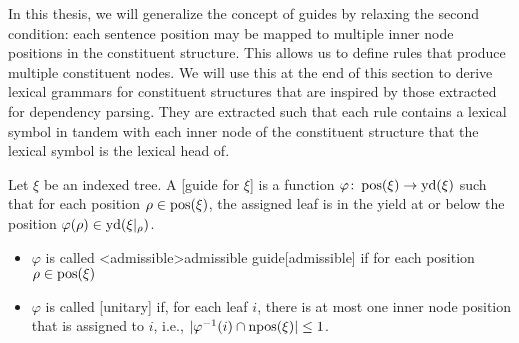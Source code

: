\documentclass[../../document.tex]{subfiles}
\begin{document}
    In this thesis, we will generalize the concept of guides by relaxing the second condition: each sentence position may be mapped to multiple inner node positions in the constituent structure.
    This allows us to define rules that produce multiple constituent nodes.
    We will use this at the end of this section to derive lexical grammars for constituent structures that are inspired by those extracted for dependency parsing.
    They are extracted such that each rule contains a lexical symbol in tandem with each inner node of the constituent structure that the lexical symbol is the lexical head of.

    \begin{definition}[Guide]\label{def:guide}
        Let \(\xi\) be an indexed tree.
        A [guide for \(\xi\)] is a function \(\varphi\colon \operatorname{pos}(\xi) \to \operatorname{yd}(\xi)\) such that for each position \(\rho \in \operatorname{pos}(\xi)\), the assigned leaf is in the yield at or below the position \(\varphi(\rho) \in \operatorname{yd}(\xi|_\rho)\).
        \begin{itemize}
            \item \(\varphi\) is called <admissible>{admissible guide}[admissible] if for each position \(\rho \in \operatorname{pos}(\xi)\)
            \item \(\varphi\) is called [unitary] if, for each leaf \(i\), there is at most one inner node position that is assigned to \(i\), i.e., \(|\varphi^{-1}(i) \cap \operatorname{npos}(\xi)| \leq 1\).
        \end{itemize}
    \end{definition}
\end{document}
